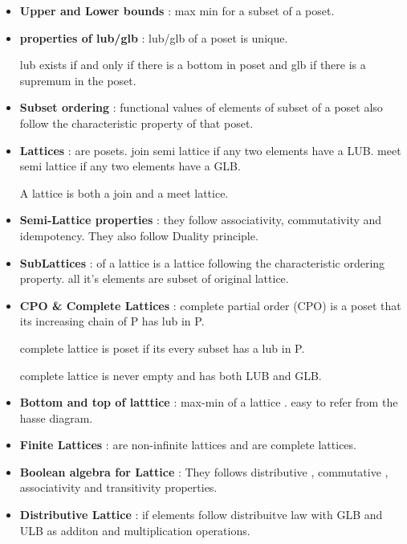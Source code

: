 \begin{itemize}
	\item{\textbf{Upper and Lower bounds} : max min for a subset of a poset.
	}

	\item{\textbf{properties of lub/glb} : 
	lub/glb of a poset is unique.

	lub exists if and only if there is a bottom in poset and glb if there is a supremum in the poset.
	}

	\item{\textbf{Subset ordering} : functional values of elements of subset of a poset also follow the characteristic property of that poset.
	}

	\item{\textbf{Lattices} : are posets.
	join semi lattice if any two elements have a LUB.
	meet semi lattice if any two elements have a GLB.

	A lattice is both a join and a meet lattice.
	}

	\item{\textbf{Semi-Lattice properties} : they follow associativity, commutativity and idempotency.
	They also follow Duality principle.
	}

	\item{\textbf{SubLattices} : of a lattice is a lattice following the characteristic ordering property. all it's elements are subset of original lattice.
	}

	\item{\textbf{CPO \& Complete Lattices} : complete partial order (CPO) is a poset that its increasing chain of P has lub in P. 

	complete lattice is poset if its every subset has a lub in P.

	complete lattice is never empty and has both LUB and GLB.
	}

	\item{\textbf{Bottom and top of latttice} : max-min of a lattice . easy to refer from the hasse diagram.
	}

	\item{\textbf{Finite Lattices} : are non-infinite lattices and are complete lattices.
	}

	\item{\textbf{Boolean algebra for Lattice} :  
	They follows distributive , commutative , associativity and transitivity properties.
	}

	\item{\textbf{Distributive Lattice} : if elements follow distribuitve law with GLB and ULB as additon and multiplication operations.
	}


\end{itemize}
